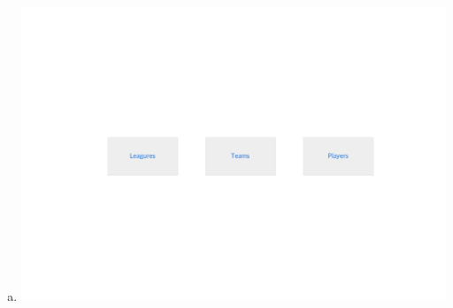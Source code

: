 \documentclass[12pt]{article}
\begin{document}
\begin{enumerate}[1.]
\begin{enumerate}[a)]
        \item

        \begin{center}
        \includegraphics[width=\linewidth]{images/worksheet_14_solution_68.png}
        \end{center}

    \end{enumerate}

\end{enumerate}
\end{document}
